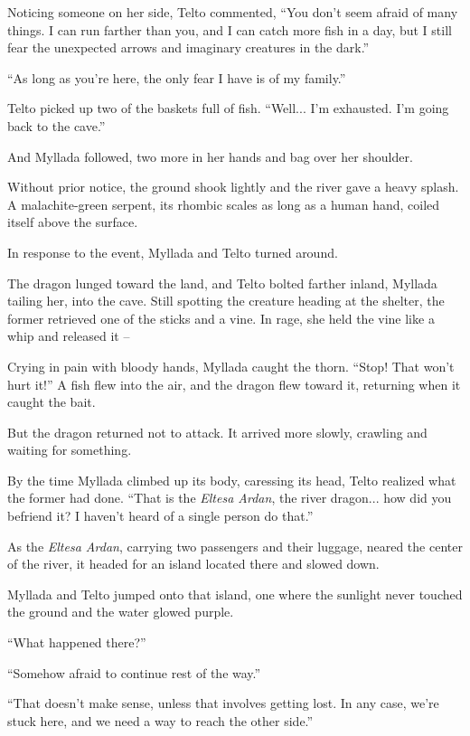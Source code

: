 Noticing someone on her side, Telto commented, ``You don't seem afraid of many things. I can run farther than you, and I can catch more fish in a day, but I still fear the unexpected arrows and imaginary creatures in the dark.''

``As long as you're here, the only fear I have is of my family.''

Telto picked up two of the baskets full of fish. ``Well... I'm exhausted. I'm going back to the cave.''

And Myllada followed, two more in her hands and bag over her shoulder.

Without prior notice, the ground shook lightly and the river gave a heavy splash. A malachite-green serpent, its rhombic scales as long as a human hand, coiled itself above the surface.

In response to the event, Myllada and Telto turned around.

The dragon lunged toward the land, and Telto bolted farther inland, Myllada tailing her, into the cave. Still spotting the creature heading at the shelter, the former retrieved one of the sticks and a vine. In rage, she held the vine like a whip and released it --

Crying in pain with bloody hands, Myllada caught the thorn. ``Stop! That won't hurt it!'' A fish flew into the air, and the dragon flew toward it, returning when it caught the bait.

But the dragon returned not to attack. It arrived more slowly, crawling and waiting for something.

By the time Myllada climbed up its body, caressing its head, Telto realized what the former had done. ``That is the \emph{Eltesa Ardan}, the river dragon... how did you befriend it? I haven't heard of a single person do that.''

\centeredstars

As the \emph{Eltesa Ardan}, carrying two passengers and their luggage, neared the center of the river, it headed for an island located there and slowed down.

Myllada and Telto jumped onto that island, one where the sunlight never touched the ground and the water glowed purple.

``What happened there?''

``Somehow afraid to continue rest of the way.''

``That doesn't make sense, unless that involves getting lost. In any case, we're stuck here, and we need a way to reach the other side.''


